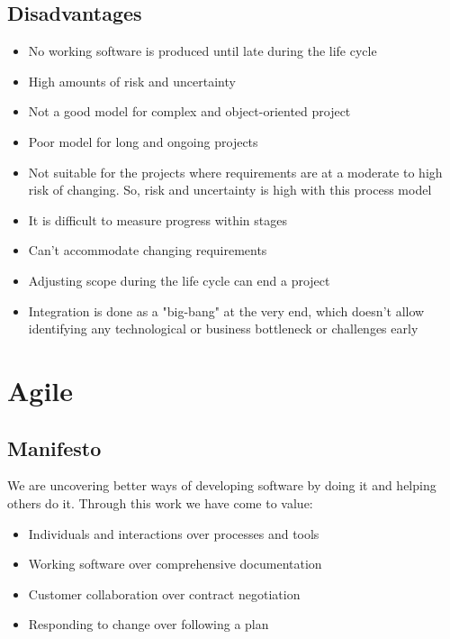 \documentclass{article}[18pt]
\begin{document}
\subsection{Disadvantages}
\begin{itemize}
	\item No working software is produced until late during the life cycle
	\item High amounts of risk and uncertainty
	\item Not a good model for complex and object-oriented project
	\item Poor model for long and ongoing projects
	\item Not suitable for the projects where requirements are at a moderate to high risk of changing. So, risk and uncertainty is high with this process model
	\item It is difficult to measure progress within stages
	\item Can't accommodate changing requirements
	\item Adjusting scope during the life cycle can end a project
	\item Integration is done as a "big-bang" at the very end, which doesn't allow identifying any technological or business bottleneck or challenges early
\end{itemize}
\section{Agile}
\subsection{Manifesto}
We are uncovering better ways of developing software by doing it and helping others do it. Through this work we have come to value:
\begin{itemize}
	\item Individuals and interactions over processes and tools
	\item Working software over comprehensive documentation
	\item Customer collaboration over contract negotiation
	\item Responding to change over following a plan
\end{itemize}
\end{document}

